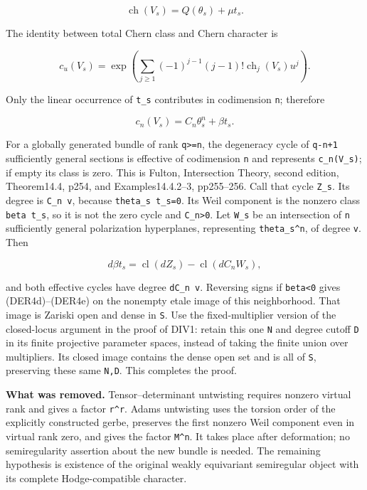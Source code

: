 \documentclass[11pt,a4paper]{article}
\theoremstyle{definition}
\begin{document}
\[
 \operatorname{ch}(V_s)=Q(\theta_s)+\mu t_s.
\]

The identity between total Chern class and Chern character is

\[
 c_u(V_s)=\exp\left(\sum_{j\ge1}(-1)^{j-1}(j-1)!
 \operatorname{ch}_j(V_s)u^j\right).
\]

Only the linear occurrence of \texttt{t\_s} contributes in codimension
\texttt{n}; therefore

\[
 c_n(V_s)=C_n\theta_s^n+\beta t_s.
\tag{DER4g}
\]

For a globally generated bundle of rank \texttt{q\textgreater{}=n}, the
degeneracy cycle of \texttt{q-n+1} sufficiently general sections is
effective of codimension \texttt{n} and represents \texttt{c\_n(V\_s)};
if empty its class is zero. This is Fulton, Intersection Theory, second
edition, Theorem14.4, p254, and Examples14.4.2--3, pp255--256. Call that
cycle \texttt{Z\_s}. Its degree is \texttt{C\_n\ v}, because
\texttt{theta\_s\ t\_s=0}. Its Weil component is the nonzero class
\texttt{beta\ t\_s}, so it is not the zero cycle and
\texttt{C\_n\textgreater{}0}. Let \texttt{W\_s} be an intersection of
\texttt{n} sufficiently general polarization hyperplanes, representing
\texttt{theta\_s\^{}n}, of degree \texttt{v}. Then

\[
 d\beta t_s=\operatorname{cl}(dZ_s)
             -\operatorname{cl}(dC_n W_s),
\]

and both effective cycles have degree \texttt{dC\_n\ v}. Reversing signs
if \texttt{beta\textless{}0} gives (DER4d)--(DER4e) on the nonempty
etale image of this neighborhood. That image is Zariski open and dense
in \texttt{S}. Use the fixed-multiplier version of the closed-locus
argument in the proof of DIV1: retain this one \texttt{N} and degree
cutoff \texttt{D} in its finite projective parameter spaces, instead of
taking the finite union over multipliers. Its closed image contains the
dense open set and is all of \texttt{S}, preserving these same
\texttt{N,D}. This completes the proof.

\textbf{What was removed.} Tensor--determinant untwisting requires
nonzero virtual rank and gives a factor \texttt{r\^{}r}. Adams
untwisting uses the torsion order of the explicitly constructed gerbe,
preserves the first nonzero Weil component even in virtual rank zero,
and gives the factor \texttt{M\^{}n}. It takes place after deformation;
no semiregularity assertion about the new bundle is needed. The
remaining hypothesis is existence of the original weakly equivariant
semiregular object with its complete Hodge-compatible character.
\end{document}
